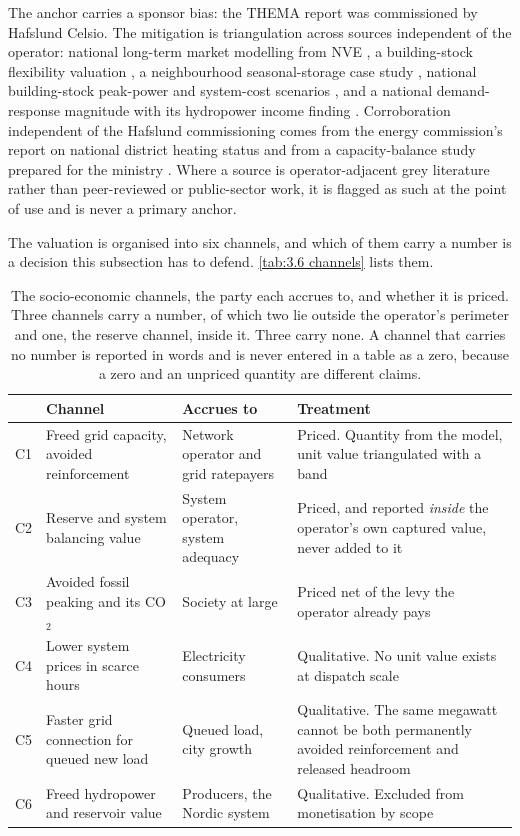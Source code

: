 The anchor carries a sponsor bias: the THEMA report was commissioned by Hafslund Celsio. The mitigation is triangulation across sources independent of the operator: national long-term market modelling from NVE \cite{nve_utviklingen_2024}, a building-stock flexibility valuation \cite{rosnes_energifleksible_2023}, a neighbourhood seasonal-storage case study \cite{kauko_assessing_2022}, national building-stock peak-power and system-cost scenarios \cite{SINTEF_energy_2023}, and a national demand-response magnitude with its hydropower income finding \cite{ahang_analysis_2025}. Corroboration independent of the Hafslund commissioning comes from the energy commission's report on national district heating status \cite{energikommisjonen_mer_2023} and from a capacity-balance study prepared for the ministry \cite{thema_consulting_group_har_2022}. Where a source is operator-adjacent grey literature rather than peer-reviewed or public-sector work, it is flagged as such at the point of use and is never a primary anchor.

The valuation is organised into six channels, and which of them carry a number is a decision this subsection has to defend. \autoref{tab:3.6 channels} lists them.

\begin{table}[h]
\centering
\caption{The socio-economic channels, the party each accrues to, and whether it is priced. Three channels carry a number, of which two lie outside the operator's perimeter and one, the reserve channel, inside it. Three carry none. A channel that carries no number is reported in words and is never entered in a table as a zero, because a zero and an unpriced quantity are different claims.}
\small
\begin{tabular}{p{0.8cm} p{4.0cm} p{3.2cm} p{6.2cm}}
\toprule
& \textbf{Channel} & \textbf{Accrues to} & \textbf{Treatment} \\
\midrule
C1 & Freed grid capacity, avoided reinforcement & Network operator and grid ratepayers & Priced. Quantity from the model, unit value triangulated with a band \\
C2 & Reserve and system balancing value & System operator, system adequacy & Priced, and reported \emph{inside} the operator's own captured value, never added to it \\
C3 & Avoided fossil peaking and its CO$_2$ & Society at large & Priced net of the levy the operator already pays \\
C4 & Lower system prices in scarce hours & Electricity consumers & Qualitative. No unit value exists at dispatch scale \\
C5 & Faster grid connection for queued new load & Queued load, city growth & Qualitative. The same megawatt cannot be both permanently avoided reinforcement and released headroom \\
C6 & Freed hydropower and reservoir value & Producers, the Nordic system & Qualitative. Excluded from monetisation by scope \\
\bottomrule
\end{tabular}
\label{tab:3.6 channels}
\end{table}

